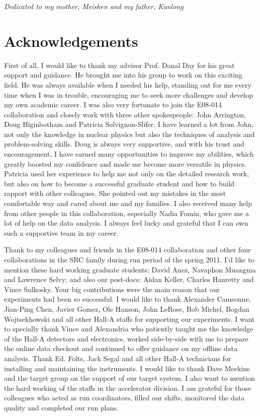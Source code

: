 \newpage

 \vspace*{1in}

 \emph{Dedicated to my mother, Meishen and my father, Kunlong}

\newpage
\chapter*{Acknowledgements}
  First of all, I would like to thank my advisor Prof. Donal Day for his great support and guidance. He brought me into his group to work on this exciting field. He was always available when I needed his help, standing out for me every time when I was in trouble, encouraging  me to seek more challenges and develop my own academic career. I was also very fortunate to join the E08-014 collaboration and closely work with three other spokespeople: John Arrington, Doug Higinbotham and Patricia Solvignon-Slifer. I have learned a lot from John, not only the knowledge in nuclear physics but also the techniques of analysis and problem-solving skills. Doug is always very supportive, and with his trust and encouragement, I have earned many opportunities to improve my abilities, which greatly boosted my confidence and made me become more versatile in physics. Patricia used her experience to help me not only on the detailed research work, but also on how to become a successful graduate student and how to build rapport with other colleagues. She pointed out my mistakes in the most comfortable way and cared about me and my families. I also received many help from other people in this collaboration, especially Nadia Fomin, who gave me a lot of help on the data analysis. I always feel lucky and grateful that I can own such a supportive team in my career.
  
  Thank to my colleagues and friends in the E08-014 collaboration and other four collaborations in the SRC family during run period of the spring 2011. I'd like to mention these hard working graduate students: David Anez, Navaphon Muangma and Lawrence Selvy; and also our post-docs: Aidan Keller, Charles Hanretty and Vince Sulkosky. Your big contributions were the main reason that our experiments had been so successful. I would like to thank Alexander Camsonne, Jian-Ping Chen, Javier Gomez, Ole Hanson, John LeRose, Bob Michel, Bogdan Wojtsekhowski and all other Hall-A staffs for supporting our experiments. I want to specially thank Vince and Alexandria who patiently taught me the knowledge of the Hall-A detectors and electronics, worked side-by-side with me to prepare the online data checkout and continued to offer guidance on my offline data analysis. Thank Ed. Folts, Jack Segal and all other Hall-A technicians for installing and maintaining the instruments. I would like to thank Dave Meekins and the target group on the support of our target system. I also want to mention the hard working of the staffs in the accelerator division. I am grateful for those colleagues who acted as run coordinators, filled our shifts, monitored the data quality and completed our run plans.
   

